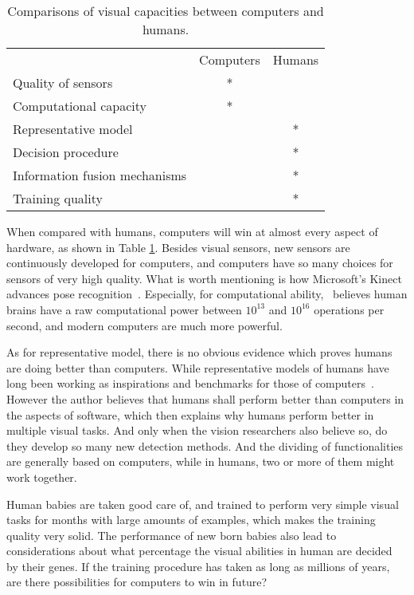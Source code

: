 \begin{table}[h]
\centering
\begin{tabular}{lcc}
     \hline
     \hline
                               &	Computers & Humans \\
    Quality of sensors         &	* &   \\
    Computational capacity      &	* &	  \\
    Representative model       &	  & * \\
    Decision procedure         &      & *	  \\
    Information fusion mechanisms & & *           \\
    Training quality           &      & *	   \\
   \hline
\end{tabular}
\caption[Comparisons in visual capacities between computers and humans]{Comparisons of visual capacities between computers and humans.}\label{c2tb:tb1}
\end{table}

When compared with humans, computers will win at almost every aspect of hardware, as shown in Table \ref{c2tb:tb1}. Besides visual sensors, new sensors are continuously developed for computers, and computers have so many choices for sensors of very high quality. What is worth mentioning is how Microsoft's Kinect advances pose recognition~\citep{knct}. Especially, for computational ability,~\citep{bpw} believes human brains have a raw computational power between $10^{13}$ and $10^{16}$ operations per second, and modern computers are much more powerful.

 As for representative model, there is no obvious evidence which proves humans are doing better than computers. While representative models of humans have long been working as inspirations and benchmarks for those of computers~\citep{rbm}. However the author believes that humans shall perform better than computers in the aspects of software, which then explains why humans perform better in multiple visual tasks. And only when the vision researchers also believe so, do they develop  so many new detection methods. And the  dividing of functionalities  are generally based on computers, while in humans, two or more of them might work together.

Human babies are taken good care of, and trained to perform very simple visual tasks for months with large amounts of examples, which makes the training quality very solid. The performance of new born babies also lead to considerations about what percentage the visual abilities in human are decided by their genes. If the training procedure has taken as long as millions of years, are there possibilities for computers to win in future?

